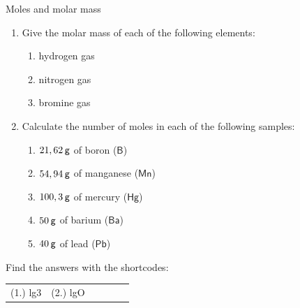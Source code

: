             \begin{exercises}{ Moles and molar mass
      }
            \nopagebreak
      \label{m38717*id277281}\begin{enumerate}[noitemsep, label=\textbf{\arabic*}. ] 
            \label{m38717*uid14}\item Give the molar mass of each of the following elements:
\label{m38717*id277295}\begin{enumerate}[noitemsep, label=\textbf{\alph*}. ] 
            \label{m38717*uid15}\item hydrogen gas
\label{m38717*uid16}\item nitrogen gas
\label{m38717*uid17}\item bromine gas
\end{enumerate}
                \label{m38717*uid18}\item Calculate the number of moles in each of the following samples:
\label{m38717*id277346}\begin{enumerate}[noitemsep, label=\textbf{\alph*}. ] 
            \label{m38717*uid19}\item $21,62\phantom{\rule{2pt}{0ex}}\mathsf{g}$ of boron ($\mathsf{B}$)
\label{m38717*uid20}\item $54,94\phantom{\rule{2pt}{0ex}}\mathsf{g}$ of manganese ($\mathsf{Mn}$)
\label{m38717*uid21}\item $100,3\phantom{\rule{2pt}{0ex}}\mathsf{g}$ of mercury ($\mathsf{Hg}$)
\label{m38717*uid22}\item $50\phantom{\rule{2pt}{0ex}}\mathsf{g}$ of barium ($\mathsf{Ba}$)
\label{m38717*uid23}\item $40\phantom{\rule{2pt}{0ex}}\mathsf{g}$ of lead ($\mathsf{Pb}$)
\end{enumerate}
                \end{enumerate}
    \label{m38717*cid4}
\par {} Find the answers with the shortcodes:
 \par \begin{tabular}[h]{cccccc}
 (1.) lg3  &  (2.) lgO  & \end{tabular}
\end{exercises}
